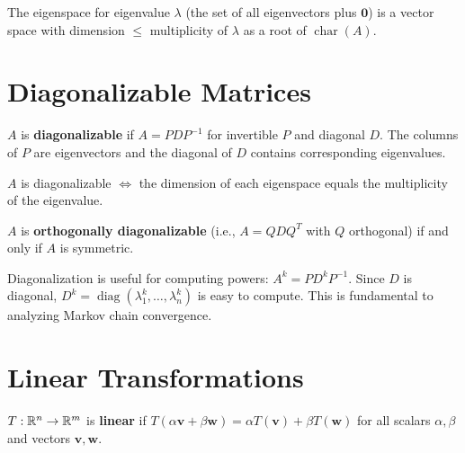 \begin{theorem}
The eigenspace for eigenvalue $\lambda$ (the set of all eigenvectors plus $\mathbf{0}$) is a vector space with dimension $\leq$ multiplicity of $\lambda$ as a root of $\operatorname{char}(A)$.
\end{theorem}

\section{Diagonalizable Matrices}

\begin{definition}
$A$ is \textbf{diagonalizable} if $A = PDP^{-1}$ for invertible $P$ and diagonal $D$. The columns of $P$ are eigenvectors and the diagonal of $D$ contains corresponding eigenvalues.
\end{definition}

\begin{theorem}
$A$ is diagonalizable $\iff$ the dimension of each eigenspace equals the multiplicity of the eigenvalue.
\end{theorem}

\begin{theorem}
$A$ is \textbf{orthogonally diagonalizable} (i.e., $A=QDQ^T$ with $Q$ orthogonal) if and only if $A$ is symmetric.
\end{theorem}

\begin{remark}
Diagonalization is useful for computing powers: $A^k = PD^kP^{-1}$. Since $D$ is diagonal, $D^k = \operatorname{diag}(\lambda_1^k,\ldots,\lambda_n^k)$ is easy to compute. This is fundamental to analyzing Markov chain convergence.
\end{remark}

\section{Linear Transformations}

\begin{definition}
$T:\mathbb{R}^n\to\mathbb{R}^m$ is \textbf{linear} if $T(\alpha\mathbf{v}+\beta\mathbf{w})=\alpha T(\mathbf{v})+\beta T(\mathbf{w})$ for all scalars $\alpha,\beta$ and vectors $\mathbf{v},\mathbf{w}$.
\end{definition}

